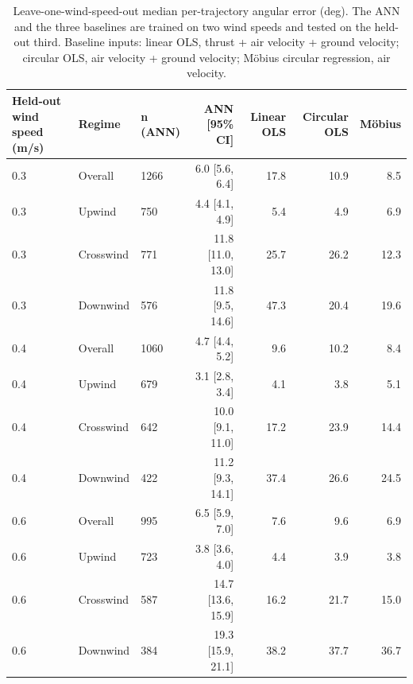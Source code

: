 \begin{table}[h!]
    \centering
    \caption{Leave-one-wind-speed-out median per-trajectory angular error (deg). The ANN and the three baselines are trained on two wind speeds and tested on the held-out third. Baseline inputs: linear OLS, thrust + air velocity + ground velocity; circular OLS, air velocity + ground velocity; M\"obius circular regression, air velocity.}
    \label{tab:lowo}
    \begin{tabular}{@{}lllrrrr@{}}
        \toprule
        Held-out wind speed (m/s) & Regime & n (ANN) & ANN [95\% CI] & Linear OLS & Circular OLS & Möbius \\
        \midrule
        0.3 & Overall & 1266 & 6.0 [5.6, 6.4] & 17.8 & 10.9 & 8.5 \\
        0.3 & Upwind & 750 & 4.4 [4.1, 4.9] & 5.4 & 4.9 & 6.9 \\
        0.3 & Crosswind & 771 & 11.8 [11.0, 13.0] & 25.7 & 26.2 & 12.3 \\
        0.3 & Downwind & 576 & 11.8 [9.5, 14.6] & 47.3 & 20.4 & 19.6 \\
        0.4 & Overall & 1060 & 4.7 [4.4, 5.2] & 9.6 & 10.2 & 8.4 \\
        0.4 & Upwind & 679 & 3.1 [2.8, 3.4] & 4.1 & 3.8 & 5.1 \\
        0.4 & Crosswind & 642 & 10.0 [9.1, 11.0] & 17.2 & 23.9 & 14.4 \\
        0.4 & Downwind & 422 & 11.2 [9.3, 14.1] & 37.4 & 26.6 & 24.5 \\
        0.6 & Overall & 995 & 6.5 [5.9, 7.0] & 7.6 & 9.6 & 6.9 \\
        0.6 & Upwind & 723 & 3.8 [3.6, 4.0] & 4.4 & 3.9 & 3.8 \\
        0.6 & Crosswind & 587 & 14.7 [13.6, 15.9] & 16.2 & 21.7 & 15.0 \\
        0.6 & Downwind & 384 & 19.3 [15.9, 21.1] & 38.2 & 37.7 & 36.7 \\
        \bottomrule
    \end{tabular}
\end{table}
